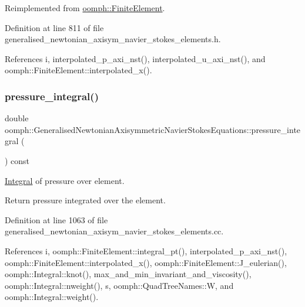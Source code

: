 Reimplemented from \hyperlink{classoomph_1_1FiniteElement_a8bf3f75b55d4e67b644df3e22c192596}{oomph\+::\+Finite\+Element}.



Definition at line 811 of file generalised\+\_\+newtonian\+\_\+axisym\+\_\+navier\+\_\+stokes\+\_\+elements.\+h.



References i, interpolated\+\_\+p\+\_\+axi\+\_\+nst(), interpolated\+\_\+u\+\_\+axi\+\_\+nst(), and oomph\+::\+Finite\+Element\+::interpolated\+\_\+x().

\mbox{\label{classoomph_1_1GeneralisedNewtonianAxisymmetricNavierStokesEquations_a442eef3d09781315e5129d33c549c2b8}} 
\subsubsection{\texorpdfstring{pressure\+\_\+integral()}{pressure\_integral()}}
{\footnotesize\ttfamily double oomph\+::\+Generalised\+Newtonian\+Axisymmetric\+Navier\+Stokes\+Equations\+::pressure\+\_\+integral (\begin{DoxyParamCaption}{ }\end{DoxyParamCaption}) const}



\hyperlink{classoomph_1_1Integral}{Integral} of pressure over element. 

Return pressure integrated over the element. 

Definition at line 1063 of file generalised\+\_\+newtonian\+\_\+axisym\+\_\+navier\+\_\+stokes\+\_\+elements.\+cc.



References i, oomph\+::\+Finite\+Element\+::integral\+\_\+pt(), interpolated\+\_\+p\+\_\+axi\+\_\+nst(), oomph\+::\+Finite\+Element\+::interpolated\+\_\+x(), oomph\+::\+Finite\+Element\+::\+J\+\_\+eulerian(), oomph\+::\+Integral\+::knot(), max\+\_\+and\+\_\+min\+\_\+invariant\+\_\+and\+\_\+viscosity(), oomph\+::\+Integral\+::nweight(), s, oomph\+::\+Quad\+Tree\+Names\+::W, and oomph\+::\+Integral\+::weight().



